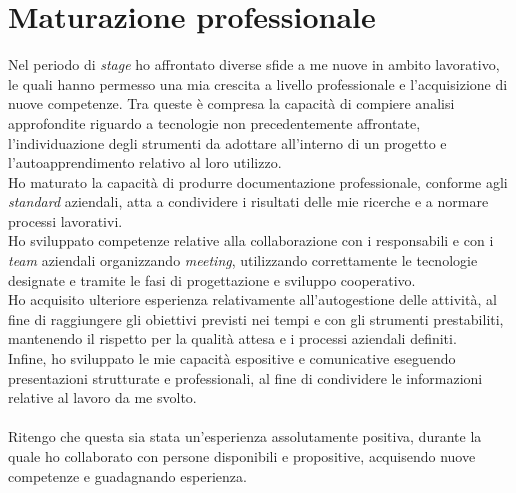 \section{Maturazione professionale}
Nel periodo di \emph{stage} ho affrontato diverse sfide a me nuove in ambito lavorativo, le quali hanno permesso una mia crescita a livello professionale e l'acquisizione di nuove competenze.
Tra queste è compresa la capacità di compiere analisi approfondite riguardo a tecnologie non precedentemente affrontate, l'individuazione degli strumenti da adottare all'interno di un progetto e l'autoapprendimento relativo al loro utilizzo.\\
Ho maturato la capacità di produrre documentazione professionale, conforme agli \emph{standard} aziendali, atta a condividere i risultati delle mie ricerche e a normare processi lavorativi.\\ 
Ho sviluppato competenze relative alla collaborazione con i responsabili e con i \emph{team} aziendali organizzando \emph{meeting}, utilizzando correttamente le tecnologie designate e tramite le fasi di progettazione e sviluppo cooperativo.\\
Ho acquisito ulteriore esperienza relativamente all'autogestione delle attività, al fine di raggiungere gli obiettivi previsti nei tempi e con gli strumenti prestabiliti, mantenendo il rispetto per la qualità attesa e i processi aziendali definiti.\\
Infine, ho sviluppato le mie capacità espositive e comunicative eseguendo presentazioni strutturate e professionali, al fine di condividere le informazioni relative al lavoro da me svolto.\\\\
Ritengo che questa sia stata un'esperienza assolutamente positiva, durante la quale ho collaborato con persone disponibili e propositive, acquisendo nuove competenze e guadagnando esperienza. 

